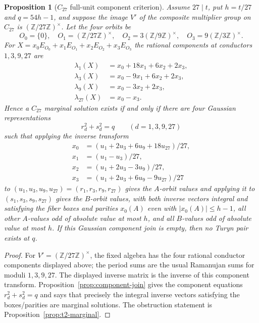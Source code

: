 \documentclass[11pt]{article}
\theoremstyle{plain}
\newtheorem{proposition}[theorem]{Proposition}
\theoremstyle{definition}
\theoremstyle{remark}
\newcommand{\Z}{\mathbb Z}
\begin{document}
\begin{proposition}[$C_{27}$ full-unit component criterion]\label{prop:c27-component}
Assume $27\mid t$, put $h=t/27$ and $q=54h-1$, and suppose the image $V'$ of the
composite multiplier group on $C_{27}$ is $(\Z/27\Z)^\times$.  Let the four
orbits be
\[
  O_0=\{0\},\quad O_1=(\Z/27\Z)^\times,\quad
  O_2=3(\Z/9\Z)^\times,\quad O_3=9(\Z/3\Z)^\times .
\]
For $X=x_0E_{O_0}+x_1E_{O_1}+x_2E_{O_2}+x_3E_{O_3}$ the rational components at
conductors $1,3,9,27$ are
\[
\begin{aligned}
  \lambda_1(X)&=x_0+18x_1+6x_2+2x_3,\\
  \lambda_3(X)&=x_0-9x_1+6x_2+2x_3,\\
  \lambda_9(X)&=x_0-3x_2+2x_3,\\
  \lambda_{27}(X)&=x_0-x_3 .
\end{aligned}
\]
Hence a $C_{27}$ marginal solution exists if and only if there are four
Gaussian representations
\[
  r_d^2+s_d^2=q\qquad(d=1,3,9,27)
\]
such that applying the inverse transform
\[
\begin{aligned}
  x_0&=(u_1+2u_3+6u_9+18u_{27})/27,\\
  x_1&=(u_1-u_3)/27,\\
  x_2&=(u_1+2u_3-3u_9)/27,\\
  x_3&=(u_1+2u_3+6u_9-9u_{27})/27
\end{aligned}
\]
to $(u_1,u_3,u_9,u_{27})=(r_1,r_3,r_9,r_{27})$ gives the $A$-orbit values and
applying it to $(s_1,s_3,s_9,s_{27})$ gives the $B$-orbit values, with both
inverse vectors integral and satisfying the fiber boxes and parities
$x_0(A)$ even with $|x_0(A)|\le h-1$, all other $A$-values odd of absolute value
at most $h$, and all $B$-values odd of absolute value at most $h$.  If this
Gaussian component join is empty, then no Turyn pair exists at $q$.
\end{proposition}

\begin{proof}
For $V'=(\Z/27\Z)^\times$, the fixed algebra has the four rational conductor
components displayed above; the period sums are the usual Ramanujan sums for
moduli $1,3,9,27$.  The displayed inverse matrix is the inverse of this
component transform.  Proposition~\ref{prop:component-join} gives the
component equations $r_d^2+s_d^2=q$ and says that precisely the integral inverse
vectors satisfying the boxes/parities are marginal solutions.  The obstruction
statement is Proposition~\ref{prop:t2-marginal}.
\end{proof}
\end{document}
